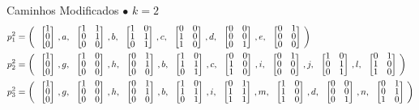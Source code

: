 \begin{frame}{Caminhos Modificados}
  \setlength\arraycolsep{2pt}
 $\bullet$ $k=2$
  \small \begin{align*}
  p_1^2&= \left(\colvec{1\\0\\0},a,\colvec{1&1\\0&1\\0&0},b,\colvec{1&0\\1&1\\0&1},c,\colvec{0&0\\1&0\\1&0},d,\colvec{0&0\\0&0\\0&1},e,\colvec{0&1\\0&0\\0&0}\right) \\ 
  p_2^2&= \left(\colvec{1\\0\\0},g,\colvec{1&0\\0&0\\0&0},h,\colvec{0&1\\0&1\\0&0},b,\colvec{1&0\\1&1\\0&1},c,\colvec{0&0\\1&0\\1&0},i,\colvec{0&1\\0&0\\0&0},j,\colvec{1&0\\0&1\\0&1},l,\colvec{0&1\\1&0\\1&0}\right) \\
  p_3^2&= \left(\colvec{1\\0\\0},g,\colvec{1&0\\0&0\\0&0},h,\colvec{0&1\\0&1\\0&0},b,\colvec{1&0\\1&1\\0&1},i,\colvec{0&1\\1&1\\1&1},m,\colvec{1&0\\1&0\\1&0},d,\colvec{0&0\\0&0\\0&1},n,\colvec{0&1\\0&1\\1&0}\right) \\
\end{align*}
\end{frame}



